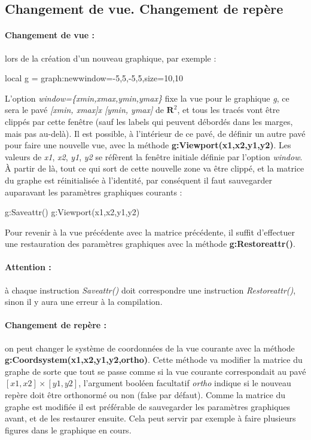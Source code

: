 \documentclass[%
10pt,%
a4paper,%
french,%
]%
{article}%
\begin{document}
\subsection{Changement de vue. Changement de repère}

\paragraph{Changement de vue : } lors de la création d'un nouveau graphique, par exemple :
\begin{Luacode}
local g = graph:new{window={-5,5,-5,5},size={10,10}}
\end{Luacode}
L'option \emph{window=\{xmin,xmax,ymin,ymax\}} fixe la vue pour le graphique \emph{g}, ce sera le pavé \emph{[xmin, xmax]x [ymin, ymax]} de $\mathbf R^2$, et tous les tracés vont être clippés par cette fenêtre (sauf les labels qui peuvent débordés dans les marges, mais pas au-delà).
Il est possible, à l'intérieur de ce pavé, de définir un autre pavé pour faire une nouvelle vue, avec la méthode \textbf{g:Viewport(x1,x2,y1,y2)}. Les valeurs de \emph{x1}, \emph{x2}, \emph{y1}, \emph{y2} se réfèrent la fenêtre initiale définie par l'option \emph{window}. À partir de là, tout ce qui sort de cette nouvelle zone va être clippé, et la matrice du graphe est réinitialisée à l'identité, par conséquent il faut sauvegarder auparavant les paramètres graphiques courants :
\begin{Luacode}
g:Saveattr()
g:Viewport(x1,x2,y1,y2)
\end{Luacode}
Pour revenir à la vue précédente avec la matrice précédente, il suffit d'effectuer une restauration des paramètres graphiques avec la méthode \textbf{g:Restoreattr()}.

\paragraph{Attention : } à chaque instruction \emph{Saveattr()} doit correspondre une instruction \emph{Restoreattr()}, sinon il y aura une erreur à la compilation.

\paragraph{Changement de repère : } on peut changer le système de coordonnées de la vue courante avec la méthode \textbf{g:Coordsystem(x1,x2,y1,y2,ortho)}. Cette méthode va modifier la matrice du graphe de sorte que tout se passe comme si la vue courante correspondait au pavé $[x1,x2]\times[y1,y2]$, l'argument booléen facultatif \emph{ortho} indique si le nouveau repère doit être orthonormé ou non (false par défaut). Comme la matrice du graphe est modifiée il est préférable de sauvegarder les paramètres graphiques avant, et de les restaurer ensuite. Cela peut servir par exemple à faire plusieurs figures dans le graphique en cours.
\end{document}
